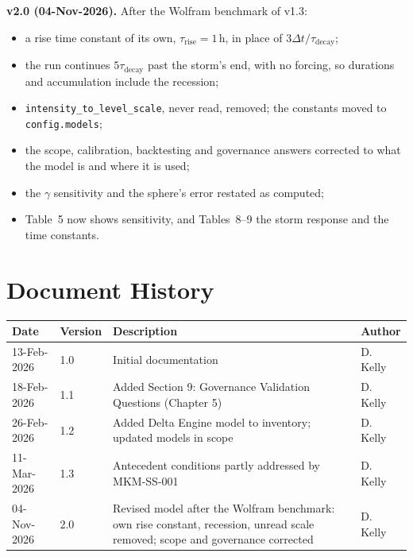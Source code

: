 \documentclass[11pt,a4paper]{article}
\renewcommand{\mkmhistorypage}[1]{%
    \section{Document History}
    \begin{table}[ht]
        \centering
        \begin{tabular}{l|l|p{9cm}|l}
            \textbf{Date} & \textbf{Version} & \textbf{Description} & \textbf{Author} \\
            \hline
            #1
        \end{tabular}
    \end{table}
}
\begin{document}
\textbf{v2.0 (04-Nov-2026).} After the Wolfram benchmark of v1.3:
\begin{itemize}[nosep]
    \item a rise time constant of its own, $\tau_{\text{rise}}=1$\,h, in place of
          $3\Delta t/\tau_{\text{decay}}$;
    \item the run continues $5\tau_{\text{decay}}$ past the storm's end, with no forcing,
          so durations and accumulation include the recession;
    \item \texttt{intensity\_to\_level\_scale}, never read, removed; the constants moved
          to \texttt{config.models};
    \item the scope, calibration, backtesting and governance answers corrected to what
          the model is and where it is used;
    \item the $\gamma$ sensitivity and the sphere's error restated as computed;
    \item Table~5 now shows sensitivity, and Tables~8--9 the storm response and the time
          constants.
\end{itemize}

\mkmhistorypage{13-Feb-2026 & 1.0 & Initial documentation & D. Kelly \\
18-Feb-2026 & 1.1 & Added Section 9: Governance Validation Questions (Chapter 5) & D. Kelly \\
26-Feb-2026 & 1.2 & Added Delta Engine model to inventory; updated models in scope & D. Kelly \\
11-Mar-2026 & 1.3 & Antecedent conditions partly addressed by MKM-SS-001 & D. Kelly \\
04-Nov-2026 & 2.0 & Revised model after the Wolfram benchmark: own rise constant, recession, unread scale removed; scope and governance corrected & D. Kelly \\}
\end{document}
